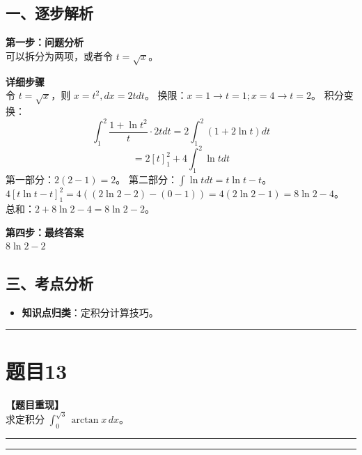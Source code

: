 \documentclass[12pt, a4paper]{ctexart}
\newcommand{\TopSeparator}{
    \par\noindent\rule{\textwidth}{1.5pt}\vspace{0.5em} %
}
\newcommand{\AnalysisSeparator}{
    \par\noindent\rule{\textwidth}{0.5pt}\vspace{0.2em}\hrule\vspace{0.5em} %
}
\newenvironment{RedAnalysis}{
    \par
    \color{red} %
}{
    \par
    \color{black} %
}
\begin{document}
\begin{RedAnalysis}

\subsection*{一、逐步解析}

\textbf{第一步：问题分析} \\
可以拆分为两项，或者令 $t=\sqrt{x}$。

\textbf{详细步骤} \\
令 $t=\sqrt{x}$，则 $x=t^2, dx=2tdt$。
换限：$x=1 \to t=1; x=4 \to t=2$。
积分变换：
\[ \int_1^2 \frac{1+\ln t^2}{t} \cdot 2t dt = 2 \int_1^2 (1 + 2\ln t) dt \]
\[ = 2 [t]_1^2 + 4 \int_1^2 \ln t dt \]
第一部分：$2(2-1) = 2$。
第二部分：$\int \ln t dt = t\ln t - t$。
$4[t\ln t - t]_1^2 = 4((2\ln 2 - 2) - (0 - 1)) = 4(2\ln 2 - 1) = 8\ln 2 - 4$。
总和：$2 + 8\ln 2 - 4 = 8\ln 2 - 2$。

\textbf{第四步：最终答案} \\
$ 8\ln 2 - 2 $

\subsection*{三、考点分析}
\begin{itemize}
    \item \textbf{知识点归类}：定积分计算技巧。
\end{itemize}

\end{RedAnalysis}

\vspace{2em}

\TopSeparator
\section*{题目13}

\textbf{【题目重现】} \\
求定积分 $ \int_{0}^{\sqrt{3}} \arctan x \, dx $。

\AnalysisSeparator
\end{document}
